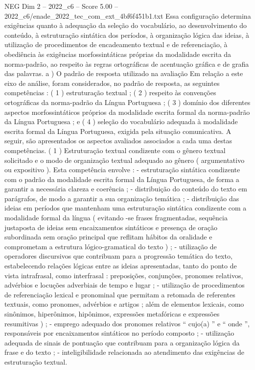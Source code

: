 \begin{textsample}{NEG Dim 2 – 2022\_c6 – Score 5.00 – 2022\_c6/enade\_2022\_tec\_com\_ext\_4bf6f451b1.txt}
Essa configuração determina exigências quanto à adequação da seleção do vocabulário, ao desenvolvimento do conteúdo, à estruturação sintática dos períodos, à organização lógica das ideias, à utilização de procedimentos de encadeamento textual e de referenciação, à obediência às exigências morfossintáticas próprias da modalidade escrita da norma-padrão, ao respeito às regras ortográficas de acentuação gráfica e de grafia das palavras. a ) O padrão de resposta utilizado na avaliação Em relação a este eixo de análise, foram considerados, no padrão de resposta, as seguintes competências : ( 1 ) estruturação textual ; ( 2 ) respeito às convenções ortográficas da norma-padrão da Língua Portuguesa ; ( 3 ) domínio dos diferentes aspectos morfossintáticos próprios da modalidade escrita formal da norma-padrão da Língua Portuguesa ; e ( 4 ) seleção do vocabulário adequada à modalidade escrita formal da Língua Portuguesa, exigida pela situação comunicativa.
A seguir, são apresentados os aspectos avaliados associados a cada uma destas competências. ( 1 ) Estruturação textual condizente com o gênero textual solicitado e o modo de organização textual adequado ao gênero ( argumentativo ou expositivo ).
Esta competência envolve : - estruturação sintática condizente com o padrão da modalidade escrita formal da Língua Portuguesa, de forma a garantir a necessária clareza e coerência ; - distribuição do conteúdo do texto em parágrafos, de modo a garantir a sua organização temática ; - distribuição das ideias em períodos que mantenham uma estruturação sintática condizente com a modalidade formal da língua ( evitando -se frases fragmentadas, sequência justaposta de ideias sem encaixamentos sintáticos e presença de oração subordinada sem oração principal que reflitam hábitos da oralidade e comprometam a estrutura lógico-gramatical do texto ) ; - utilização de operadores discursivos que contribuam para a progressão temática do texto, estabelecendo relações lógicas entre as ideias apresentadas, tanto do ponto de vista intrafrasal, como interfrasal : preposições, conjunções, pronomes relativos, advérbios e locuções adverbiais de tempo e lugar ; - utilização de procedimentos de referenciação lexical e pronominal que permitam a retomada de referentes textuais, como pronomes, advérbios e artigos ; além de elementos lexicais, como sinônimos, hiperônimos, hipônimos, expressões metafóricas e expressões resumitivas ) ; - emprego adequado dos pronomes relativos “ cujo(a) ” e “ onde ”, responsáveis por encaixamentos sintáticos no período composto ; - utilização adequada de sinais de pontuação que contribuam para a organização lógica da frase e do texto ; - inteligibilidade relacionada ao atendimento das exigências de estruturação textual.

\end{textsample}
